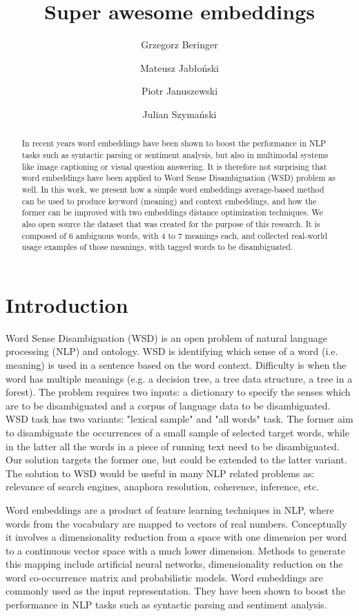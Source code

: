 \documentclass{llncs}
\title{Super awesome embeddings}
\author{Grzegorz Beringer \and Mateusz Jabłoński \and Piotr Januszewski \and Julian Szymański}
\institute{
Faculty of Electronic Telecommunications and Informatics\\
Gda{\'n}sk University of Technology, Gda{\'n}sk, Poland
}
\begin{document}
\maketitle
\begin{abstract}

In recent years word embeddings have been shown to boost the performance in NLP tasks such as syntactic parsing or sentiment analysis, but also in multimodal systems like image captioning or visual question answering.
It is therefore not surprising that word embeddings have been applied to Word Sense Disambiguation (WSD) problem as well.
In this work, we present how a simple word embeddings average-based method can be used to produce keyword (meaning) and context embeddings, and how the former can be improved with two embeddings distance optimization techniques.
We also open source the dataset that was created for the purpose of this research.
It is composed of 6 ambiguous words, with 4 to 7 meanings each, and collected real-world usage examples of those meanings, with tagged words to be disambiguated.

\end{abstract}

\section{Introduction}
\label{introduction}

Word Sense Disambiguation (WSD) is an open problem of natural language processing (NLP) and ontology. WSD is identifying which sense of a word (i.e. meaning) is used in a sentence based on the word context. Difficulty is when the word has multiple meanings (e.g. a decision tree, a tree data structure, a tree in a forest). The problem requires two inputs: a dictionary to specify the senses which are to be disambiguated and a corpus of language data to be disambiguated. WSD task has two variants: "lexical sample" and "all words" task. The former aim to disambiguate the occurrences of a small sample of selected target words, while in the latter all the words in a piece of running text need to be disambiguated. Our solution targets the former one, but could be extended to the latter variant.
The solution to WSD would be useful in many NLP related problems as: relevance of search engines, anaphora resolution, coherence, inference, etc.

Word embeddings are a product of feature learning techniques in NLP, where words from the vocabulary are mapped to vectors of real numbers. Conceptually it involves a dimensionality reduction from a space with one dimension per word to a continuous vector space with a much lower dimension.
Methods to generate this mapping include artificial neural networks\cite{word2vec}\cite{GloVe}\cite{fastText}, dimensionality reduction on the word co-occurrence matrix\cite{Levy2014NWE} and probabilistic models\cite{Globerson2007EEC}.
Word embeddings are commonly used as the input representation. They have been shown to boost the performance in NLP tasks such as syntactic parsing\cite{parsingGrammars} and sentiment analysis\cite{sentimentAnalysis}.
\end{document}
